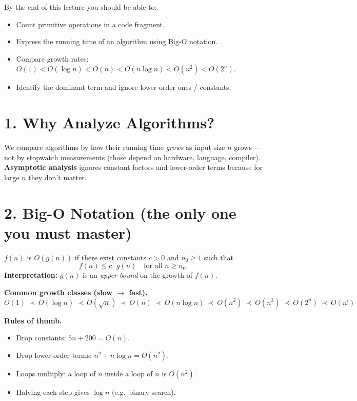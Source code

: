 \documentclass[11pt]{article}
\begin{document}

\begin{objbox}
By the end of this lecture you should be able to:
\begin{itemize}[leftmargin=*]
  \item Count primitive operations in a code fragment.
  \item Express the running time of an algorithm using Big-O notation.
  \item Compare growth rates: $O(1) < O(\log n) < O(n) < O(n\log n) < O(n^2) < O(2^n)$.
  \item Identify the dominant term and ignore lower-order ones / constants.
\end{itemize}
\end{objbox}

\section*{1. Why Analyze Algorithms?}

We compare algorithms by how their running time \emph{grows} as input size $n$ grows --- not by stopwatch measurements (those depend on hardware, language, compiler). \textbf{Asymptotic analysis} ignores constant factors and lower-order terms because for large $n$ they don't matter.

\section*{2. Big-O Notation (the only one you must master)}

\begin{notebox}
$f(n)$ is $O(g(n))$ if there exist constants $c>0$ and $n_0\geq 1$ such that
\[
f(n) \leq c\cdot g(n) \quad \text{for all } n \geq n_0.
\]
\textbf{Interpretation:} $g(n)$ is an \emph{upper bound} on the growth of $f(n)$.
\end{notebox}

\textbf{Common growth classes (slow $\to$ fast).}
\[
O(1)\ \prec\ O(\log n)\ \prec\ O(\sqrt{n})\ \prec\ O(n)\ \prec\ O(n\log n)\ \prec\ O(n^2)\ \prec\ O(n^3)\ \prec\ O(2^n)\ \prec\ O(n!)
\]

\textbf{Rules of thumb.}
\begin{itemize}[leftmargin=*]
  \item Drop constants: $5n+200 = O(n)$.
  \item Drop lower-order terms: $n^2+n\log n = O(n^2)$.
  \item Loops multiply: a loop of $n$ inside a loop of $n$ is $O(n^2)$.
  \item Halving each step gives $\log n$ (e.g.\ binary search).
\end{itemize}
\end{document}

